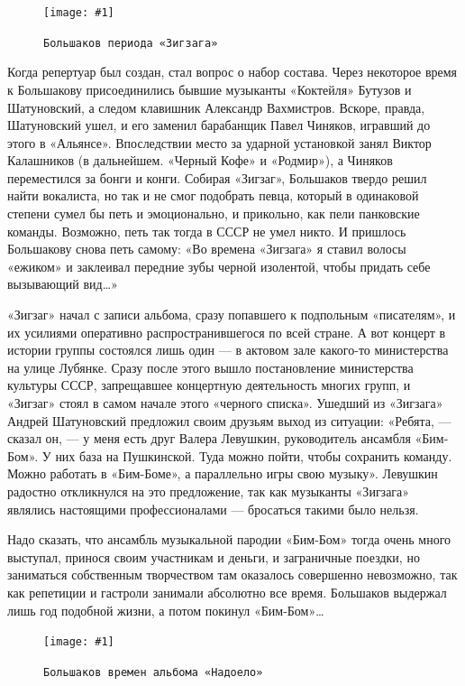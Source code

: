 \documentclass[16pt,a5paper]{book}
\newcommand{\myincludegraphics}[1]{\texttt{[image: \#1]}}
\begin{document}
\begin{figure}
    \centering
    \myincludegraphics{Image12}
    \caption{\texttt{Большаков периода «Зигзага»}}
\end{figure}

Когда репертуар был создан, стал вопрос о набор состава. Через некоторое время к Большакову присоединились бывшие
музыканты «Коктейля» Бутузов и Шатуновский, а следом клавишник Александр Вахмистров. Вскоре, правда, Шатуновский ушел, и
его заменил барабанщик Павел Чиняков, игравший до этого в «Альянсе». Впоследствии место за ударной установкой занял
Виктор Калашников (в дальнейшем. «Черный Кофе» и «Родмир»), а Чиняков переместился за бонги и конги. Собирая «Зигзаг»,
Большаков твердо решил найти вокалиста, но так и не смог подобрать певца, который в одинаковой степени сумел бы петь и
эмоционально, и прикольно, как пели панковские команды. Возможно, петь так тогда в СССР не умел никто. И пришлось
Большакову снова петь самому: «Во времена «Зигзага» я ставил волосы «ежиком» и заклеивал передние зубы черной изолентой,
чтобы придать себе вызывающий вид\ldots»

«Зигзаг» начал с записи альбома, сразу попавшего к подпольным «писателям», и их усилиями оперативно распространившегося
по всей стране. А вот концерт в истории группы состоялся лишь один — в актовом зале какого-то министерства на улице
Лубянке. Сразу после этого вышло постановление министерства культуры СССР, запрещавшее концертную деятельность многих
групп, и «Зигзаг» стоял в самом начале этого «черного списка». Ушедший из «Зигзага» Андрей Шатуновский предложил своим
друзьям выход из ситуации: «Ребята, — сказал он, — у меня есть друг Валера Левушкин, руководитель ансамбля «Бим-Бом». У
них база на Пушкинской. Туда можно пойти, чтобы сохранить команду. Можно работать в «Бим-Боме», а параллельно игры свою
музыку». Левушкин радостно откликнулся на это предложение, так как музыканты «Зигзага» являлись настоящими
профессионалами — бросаться такими было нельзя.

Надо сказать, что ансамбль музыкальной пародии «Бим-Бом» тогда очень много выступал, принося своим участникам и деньги,
и заграничные поездки, но заниматься собственным творчеством там оказалось совершенно невозможно, так как репетиции и
гастроли занимали абсолютно все время. Большаков выдержал лишь год подобной жизни, а потом покинул «Бим-Бом»\ldots

\begin{figure}[h]
    \centering
    \myincludegraphics{Image13}
    \caption{\texttt{Большаков времен альбома «Надоело»}}
\end{figure}
\end{document}
